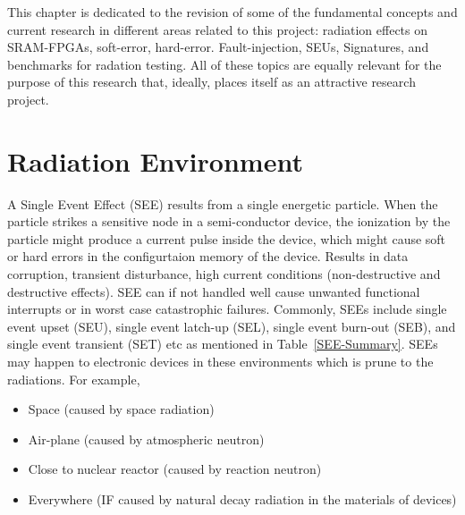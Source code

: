 \label{sec:related}


This chapter is dedicated to the revision of some of the fundamental concepts and current research in different areas related to this project: radiation effects on SRAM-FPGAs, soft-error, hard-error. Fault-injection, SEUs, Signatures, and benchmarks for radation testing. All of these topics are equally relevant for the purpose of this research that, ideally, places itself as an attractive research project.

\section{Radiation Environment}

A Single Event Effect (SEE) results from a single energetic particle. When the particle strikes a sensitive node in a semi-conductor device, the ionization by the particle might produce a current pulse inside the device, which might cause soft or hard errors in the configurtaion memory of the device. Results in data corruption, transient disturbance, high current conditions (non-destructive and destructive
effects). SEE can if not handled well cause unwanted functional interrupts or in worst case catastrophic failures. Commonly, SEEs include single event upset (SEU), single event latch-up (SEL), single event burn-out (SEB), and single event transient (SET) etc as mentioned in Table~\ref{SEE-Summary}. SEEs may happen to electronic devices in these environments which is prune to the radiations. For example,
\begin{itemize}


   \item  Space (caused by space radiation)
    \item Air-plane (caused by atmospheric neutron)
    \item Close to nuclear reactor (caused by reaction neutron)
    \item Everywhere (IF caused by natural decay radiation in the materials of devices)

\end{itemize}



